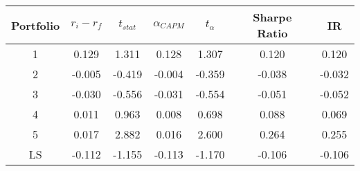 \begin{tabular}{ccccccc}
\toprule
Portfolio &  $r_i - r_f$ &  $t_{stat}$ &  $\alpha_{CAPM}$ &  $t_{\alpha}$ &  Sharpe Ratio &     IR \\
\midrule
        1 &        0.129 &       1.311 &            0.128 &         1.307 &         0.120 &  0.120 \\
        2 &       -0.005 &      -0.419 &           -0.004 &        -0.359 &        -0.038 & -0.032 \\
        3 &       -0.030 &      -0.556 &           -0.031 &        -0.554 &        -0.051 & -0.052 \\
        4 &        0.011 &       0.963 &            0.008 &         0.698 &         0.088 &  0.069 \\
        5 &        0.017 &       2.882 &            0.016 &         2.600 &         0.264 &  0.255 \\
       LS &       -0.112 &      -1.155 &           -0.113 &        -1.170 &        -0.106 & -0.106 \\
\bottomrule
\end{tabular}
